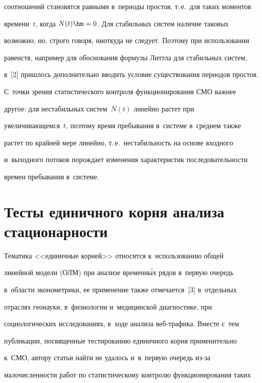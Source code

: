 соотношений становятся равными в~периоды про\-стоя, т.\,е.\ для таких моментов 


времени~$t$, когда $N(t)\hm=0$. Для стабильных сис\-тем наличие таковых 


возможно, но, строго говоря, ниоткуда не следует. Поэтому при использовании 


равенств, например для обоснования формулы Литтла для стабильных сис\-тем, 


в~[2] пришлось дополнительно вводить условие существования периодов про\-стоя.


     


     С~точки зрения статистического контроля функционирования СМО важ\-нее 


другое: для нестабильных сис\-тем~$N(t)$ линейно растет при 


уве\-ли\-чи\-ва\-ющем\-ся~$t$, поэтому время пребывания в~сис\-те\-ме в~среднем также 


растет по крайней мере линейно, т.\,е.\ не\-ста\-биль\-ность на основе входного 


и~выходного потоков по\-рож\-да\-ет изменения характеристик по\-сле\-до\-ва\-тель\-ности 


времен пребывания в~сис\-теме. 





\section{Тесты единичного корня анализа стационарности}





     Тематика <<единичные корней>> относится к~использованию общей 


линейной модели (ОЛМ) при анализе временн\'{ы}х рядов в~первую очередь  


в~об\-ласти эко\-но\-мет\-ри\-ки, ее применение также отмечается~[3] в~отдельных 


отраслях геонауки, в~физиологии и~медицинской диагностике, при 


социологических исследованиях, в~ходе анализа веб-тра\-фи\-ка. Вместе с~тем 


пуб\-ли\-ка\-ции, посвященные тестированию единичного корня применительно 


к~СМО, автору \mbox{статьи} найти не удалось и~в~первую очередь из-за 


ма\-ло\-чис\-лен\-ности работ по статистическому контролю функционирования таких 


